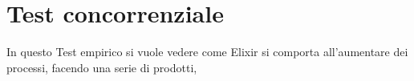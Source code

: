 \section{Test concorrenziale}

In questo Test empirico si vuole vedere come Elixir
si comporta all'aumentare dei processi, facendo una
serie di prodotti, 